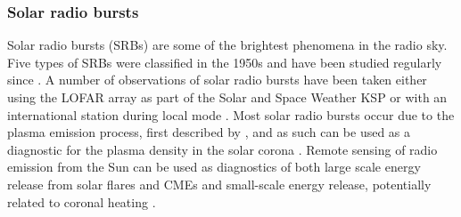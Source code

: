 %
%
%

\subsubsection{Solar radio bursts}
Solar radio bursts (SRBs) are some of the brightest phenomena in the radio sky. Five types of SRBs were classified in the 1950s \citep{Wild1950b, Boischot1957, Wild1959} and have been studied regularly since \citep[See][for a comprehensive review]{Pick2008}. A number of observations of solar radio bursts have been taken either using the LOFAR array as part of the Solar and Space Weather KSP \citep[for example,][]{Zhang2020, Murphy2021} or with an international station during local mode \citep[for example,][]{Morosan2019, Maguire2020, Bartosz2020}. Most solar radio bursts occur due to the plasma emission process, first described by \cite{Ginzburg1958}, and as such can be used as a diagnostic for the plasma density in the solar corona \citep{Melrose1987}. Remote sensing of radio emission from the Sun can be used as diagnostics of both large scale energy release from solar flares and CMEs \citep{Carley2021} and small-scale energy release, potentially related to coronal heating \citep{Mondal2020}.


